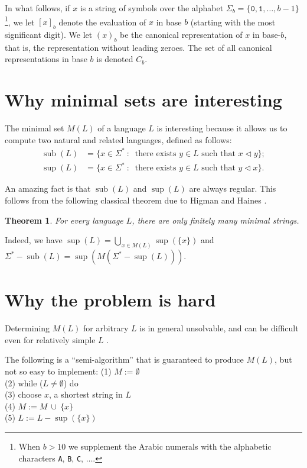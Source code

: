 \documentclass[12pt]{article}
\def\subw{\triangleleft}
\DeclareMathOperator\supe{sup}
\DeclareMathOperator\subb{sub}
\theoremstyle{plain}
\newtheorem{theorem}{Theorem}
\theoremstyle{definition}
\theoremstyle{remark}
\newcommand{\0}{\mathtt{0}}
\newcommand{\1}{\mathtt{1}}
\newcommand{\2}{\mathtt{2}}
\newcommand{\3}{\mathtt{3}}
\newcommand{\4}{\mathtt{4}}
\newcommand{\5}{\mathtt{5}}
\newcommand{\6}{\mathtt{6}}
\newcommand{\7}{\mathtt{7}}
\newcommand{\8}{\mathtt{8}}
\newcommand{\9}{\mathtt{9}}
\begin{document}
In what follows, if $x$ is a string of symbols over the alphabet
$\Sigma_b = \lbrace \0, \1, \ldots, b-1 \rbrace$\footnote{When
$b>10$ we supplement the Arabic numerals with the
alphabetic characters \texttt{A}, \texttt{B}, \texttt{C}, $\dotsc$.}, we let 
$[x]_b$ denote the evaluation of $x$ in base $b$ (starting with the
most significant digit).  We let $(x)_b$ be the canonical representation
of $x$ in base-$b$, that is, the representation without leading zeroes.
The set of all canonical representations in base $b$ is denoted
$C_b$.

\section{Why minimal sets are interesting}

The minimal set $M(L)$ of a language $L$ is interesting because it
allows us to compute two natural and related languages,
defined as follows:
\begin{align*}
\subb(L) &= \lbrace x \in \Sigma^* \ : \ 
	\text{ there exists } y \in L \text{ such that } x \subw y \rbrace  ;\\
\supe(L) &= \lbrace x \in \Sigma^* \ : \ 
	\text{ there exists } y \in L \text{ such that } y \subw x \rbrace .
\end{align*}

An amazing fact is that $\subb(L)$ and $\supe(L)$ are always regular.
This follows from
the following classical theorem due to Higman \cite{Hi52} and
Haines \cite{Ha69}.

\begin{theorem}
For every language $L$, there are only finitely many minimal strings.
\end{theorem}

Indeed, we have $\supe(L) = \bigcup_{x \in M(L)} \supe (\lbrace x \rbrace)$
and $\Sigma^* - \subb(L) = \supe(M(\Sigma^* - \supe(L)))$.

\section{Why the problem is hard}

Determining $M(L)$ for arbitrary $L$
is in general unsolvable, and can be difficult even for
relatively simple $L$ \cite{GHK07}.

The following is a ``semi-algorithm'' that 
is guaranteed to produce $M(L)$, but not so easy to implement:
\bigskip
\noindent (1) $ M := \emptyset$ \\
\noindent (2) while ($L \not= \emptyset$) do \\
\quad (3) choose $x$, a shortest string in $L$ \\
\quad (4) $ M := M \ \cup \ \lbrace  x \rbrace$ \\
\quad (5) $ L := L - \supe(\lbrace x \rbrace) $ \\
\end{document}
